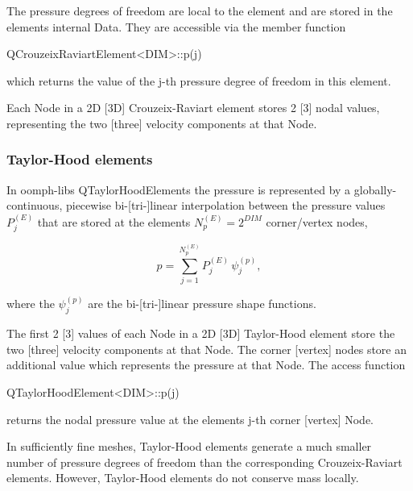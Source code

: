 The pressure degrees of freedom are local to the element and are stored in the element\textquotesingle{}s internal {\ttfamily Data}. They are accessible via the member function


\begin{DoxyCode}
QCrouzeixRaviartElement<DIM>::p(j)
\end{DoxyCode}


which returns the value of the {\ttfamily j-\/th} pressure degree of freedom in this element.

Each {\ttfamily Node} in a 2D \mbox{[}3D\mbox{]} Crouzeix-\/\+Raviart element stores 2 \mbox{[}3\mbox{]} nodal values, representing the two \mbox{[}three\mbox{]} velocity components at that {\ttfamily Node}.



\hypertarget{index_TH}{}\subsubsection{Taylor-\/\+Hood elements}\label{index_TH}
In {\ttfamily oomph-\/lib\textquotesingle{}s} {\ttfamily Q\+Taylor\+Hood\+Elements} the pressure is represented by a globally-\/continuous, piecewise bi-\/\mbox{[}tri-\/\mbox{]}linear interpolation between the pressure values $ P_j^{(E)} $ that are stored at the elements\textquotesingle{} $ N_p^{(E)} = 2^{DIM}$ corner/vertex nodes, \begin{center} \[ p = \sum_{j=1}^{N_p^{(E)}} P_j^{(E)} \, \psi_j^{(p)}, \] \end{center}  where the $\psi_j^{(p)}$ are the bi-\/\mbox{[}tri-\/\mbox{]}linear pressure shape functions.

The first 2 \mbox{[}3\mbox{]} values of each {\ttfamily Node} in a 2D \mbox{[}3D\mbox{]} Taylor-\/\+Hood element store the two \mbox{[}three\mbox{]} velocity components at that {\ttfamily Node}. The corner \mbox{[}vertex\mbox{]} nodes store an additional value which represents the pressure at that {\ttfamily Node}. The access function 
\begin{DoxyCode}
QTaylorHoodElement<DIM>::p(j)
\end{DoxyCode}
 returns the nodal pressure value at the element\textquotesingle{}s {\ttfamily j-\/th} corner \mbox{[}vertex\mbox{]} {\ttfamily Node}.

In sufficiently fine meshes, Taylor-\/\+Hood elements generate a much smaller number of pressure degrees of freedom than the corresponding Crouzeix-\/\+Raviart elements. However, Taylor-\/\+Hood elements do not conserve mass locally.



